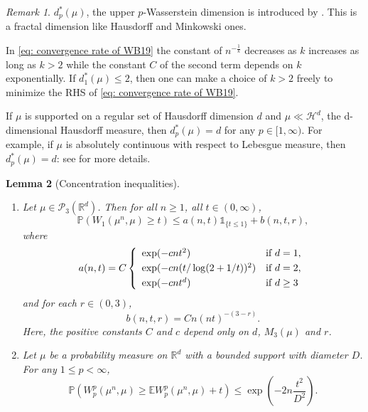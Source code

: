 \documentclass{amsart}
\theoremstyle{plain}
\numberwithin{equation}{section}\newtheorem{theorem}{Theorem}[section]
\newtheorem{lemma}[theorem]{Lemma}
\theoremstyle{remark}
\newtheorem{remark}[theorem]{Remark}
\begin{document}
\begin{appendices}
\begin{remark}
$d^*_p(\mu)$, the upper $p$-Wasserstein dimension is introduced by \citet{JW_FB_sample_rates}. This is a fractal dimension like Hausdorff and Minkowski ones.



In \eqref{eq: convergence rate of WB19} the constant of $n^{-\frac{1}{k}}$ decreases as $k$ increases as long as $k > 2$ while the constant $C$ of the second term depends on $k$ exponentially. If $d^*_1(\mu) \leq 2$, then one can make a choice of $k > 2$ freely to minimize the RHS of \eqref{eq: convergence rate of WB19}. 


If $\mu$ is supported on a regular set of Hausdorff dimension $d$ and $\mu \ll \mathcal{H}^d$, the d-dimensional Hausdorff measure, then $d^*_p(\mu) = d$ for any $p \in [1, \infty)$. For example, if $\mu$ is absolutely continuous with respect to Lebesgue measure, then $d^*_p(\mu) = d$: see \cite[Propositions 8 and 9]{JW_FB_sample_rates} for more details.    
\end{remark}







\begin{lemma}[Concentration inequalities]\cite[Theorems 2]{NF_AG_rate_Wasserstein}\cite[Propositions 20]{JW_FB_sample_rates}\label{lem:concentration}
\begin{enumerate}
    \item[(i)] Let $\mu \in \mathcal{P}_3(\mathbb{R}^d)$. Then for all $n \geq 1$, all $t \in (0,\infty)$,
\[
    \mathbb{P}(W_1(\mu^n,\mu) \geq t) \leq a(n,t)\mathds{1}_{\{t\leq 1\}}+b(n,t, r),
\]
where
\[
    a(n,t)=C 
    \left\{\begin{array}{ll}
    \exp(-cnt^2) & \hbox{if $d=1$}, \\[+3pt]
    \exp(-cn(t/\log(2+1/t))^2) & \hbox{if $d=2$}, \\[+3pt]
    \exp(-cn t^{d}) & \hbox{if $d \geq 3$}
\end{array}\right.
\]
and for each $r \in (0, 3)$,
\[
    b(n,t, r)= C
    n (nt)^{-(3 -r)}.
\]
Here, the positive constants $C$ and $c$ depend only on $d$, $M_3(\mu)$ and $r$.
    \item[(ii)] Let $\mu$ be a probability measure on $\mathbb{R}^{d}$ with a bounded support with diameter $D$. For any $1 \leq p < \infty$,
\begin{equation*}
    \mathbb{P}\left( W_p^p(\mu^n, \mu) \geq \mathbb{E} W_p^p(\mu^n, \mu) + t \right) \leq \exp\left(-2n\frac{t^2}{D^2}\right).
\end{equation*}
\end{enumerate}
\end{lemma}
   
\end{appendices}
\end{document}
